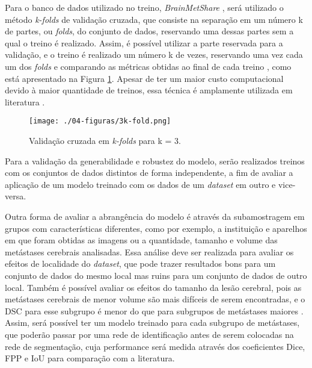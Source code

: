 Para o banco de dados utilizado no treino, \textit{BrainMetShare} \cite{Grovik:2020}, será utilizado o método \textit{k-folds} de validação cruzada, que consiste na separação em um número k de partes, ou \textit{folds}, do conjunto de dados, reservando uma dessas partes sem a qual o treino é realizado. Assim, é possível utilizar a parte reservada para a validação, e o treino é realizado um número k de vezes, reservando uma vez cada um dos \textit{folds} e comparando as métricas obtidas ao final de cada treino \cite{Chollet:2017}, como está apresentado na Figura \ref{fig:3k-fold}. Apesar de ter um maior custo computacional devido à maior quantidade de treinos, essa técnica é amplamente utilizada em literatura \cite{Liu:2017,Dikici:2020,Xue:2020,Pennig:2021,Park:2021}.

\begin{figure}[!htb]
\centering
    \texttt{[image: ./04-figuras/3k-fold.png]}
	\caption{Validação cruzada em \textit{k-folds} para k = 3.}\vspace{-0.2cm}
    \label{fig:3k-fold}
\end{figure}

Para a validação da generabilidade e robustez do modelo, serão realizados treinos com os conjuntos de dados distintos \cite{Grovik:2020,Ocaña-Tienda:2023} de forma independente, a fim de avaliar a aplicação de um modelo treinado com os dados de um \textit{dataset} em outro e vice-versa.

Outra forma de avaliar a abrangência do modelo é através da subamostragem em grupos com características diferentes, como por exemplo, a instituição e aparelhos em que foram obtidas as imagens ou a quantidade, tamanho e volume das metástases cerebrais analisadas. Essa análise deve ser realizada para avaliar os efeitos de localidade do \textit{dataset}, que pode trazer resultados bons para um conjunto de dados do mesmo local mas ruins para um conjunto de dados de outro local. Também é possível avaliar os efeitos do tamanho da lesão cerebral, pois as metástases cerebrais de menor volume são mais difíceis de serem encontradas, e o DSC para esse subgrupo é menor do que para subgrupos de metástases maiores \cite{Bousabarah:2020}. Assim, será possível ter um modelo treinado para cada subgrupo de metástases, que poderão passar por uma rede de identificação antes de serem colocadas na rede de segmentação, cuja performance será medida através dos coeficientes Dice, FPP e IoU para comparação com a literatura.

